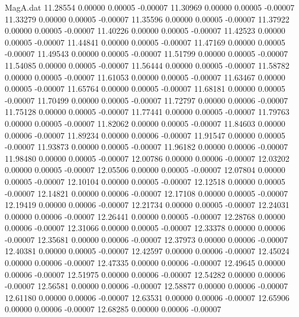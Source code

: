 \begin{filecontents}{MagA.dat}
  11.28554    0.00000    0.00005   -0.00007
  11.30969    0.00000    0.00005   -0.00007
  11.33279    0.00000    0.00005   -0.00007
  11.35596    0.00000    0.00005   -0.00007
  11.37922    0.00000    0.00005   -0.00007
  11.40226    0.00000    0.00005   -0.00007
  11.42523    0.00000    0.00005   -0.00007
  11.44841    0.00000    0.00005   -0.00007
  11.47169    0.00000    0.00005   -0.00007
  11.49543    0.00000    0.00005   -0.00007
  11.51799    0.00000    0.00005   -0.00007
  11.54085    0.00000    0.00005   -0.00007
  11.56444    0.00000    0.00005   -0.00007
  11.58782    0.00000    0.00005   -0.00007
  11.61053    0.00000    0.00005   -0.00007
  11.63467    0.00000    0.00005   -0.00007
  11.65764    0.00000    0.00005   -0.00007
  11.68181    0.00000    0.00005   -0.00007
  11.70499    0.00000    0.00005   -0.00007
  11.72797    0.00000    0.00006   -0.00007
  11.75128    0.00000    0.00005   -0.00007
  11.77441    0.00000    0.00005   -0.00007
  11.79763    0.00000    0.00005   -0.00007
  11.82062    0.00000    0.00005   -0.00007
  11.84603    0.00000    0.00006   -0.00007
  11.89234    0.00000    0.00006   -0.00007
  11.91547    0.00000    0.00005   -0.00007
  11.93873    0.00000    0.00005   -0.00007
  11.96182    0.00000    0.00006   -0.00007
  11.98480    0.00000    0.00005   -0.00007
  12.00786    0.00000    0.00006   -0.00007
  12.03202    0.00000    0.00005   -0.00007
  12.05506    0.00000    0.00005   -0.00007
  12.07804    0.00000    0.00005   -0.00007
  12.10104    0.00000    0.00005   -0.00007
  12.12518    0.00000    0.00005   -0.00007
  12.14821    0.00000    0.00006   -0.00007
  12.17108    0.00000    0.00005   -0.00007
  12.19419    0.00000    0.00006   -0.00007
  12.21734    0.00000    0.00005   -0.00007
  12.24031    0.00000    0.00006   -0.00007
  12.26441    0.00000    0.00005   -0.00007
  12.28768    0.00000    0.00006   -0.00007
  12.31066    0.00000    0.00005   -0.00007
  12.33378    0.00000    0.00006   -0.00007
  12.35681    0.00000    0.00006   -0.00007
  12.37973    0.00000    0.00006   -0.00007
  12.40381    0.00000    0.00005   -0.00007
  12.42597    0.00000    0.00006   -0.00007
  12.45024    0.00000    0.00006   -0.00007
  12.47335    0.00000    0.00006   -0.00007
  12.49645    0.00000    0.00006   -0.00007
  12.51975    0.00000    0.00006   -0.00007
  12.54282    0.00000    0.00006   -0.00007
  12.56581    0.00000    0.00006   -0.00007
  12.58877    0.00000    0.00006   -0.00007
  12.61180    0.00000    0.00006   -0.00007
  12.63531    0.00000    0.00006   -0.00007
  12.65906    0.00000    0.00006   -0.00007
  12.68285    0.00000    0.00006   -0.00007

\end{filecontents}
